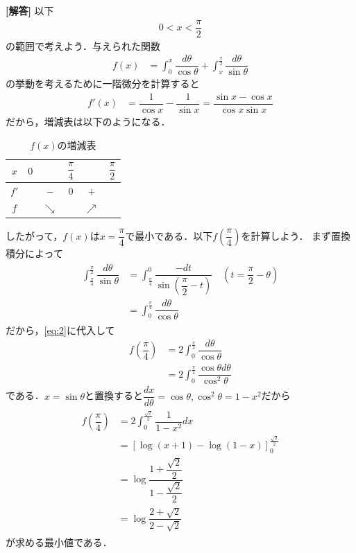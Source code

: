 \documentclass[../../main.tex]{subfiles}
\begin{document}
\begin{oframed}
  
\end{oframed}

{\bf [解答]}
以下
\begin{align}
  0<x<\dfrac{\pi}{2} \label{eq:1}
\end{align}
の範囲で考えよう．与えられた関数
\begin{align}
  f(x)&=\int_0^x\dfrac{d\theta}{\cos\theta}+\int_x^{\frac{\pi}{2}}\dfrac{d\theta}{\sin\theta} \label{eq:2}
\end{align}
の挙動を考えるために一階微分を計算すると
\begin{align}
  f'(x)&=\dfrac{1}{\cos x}-\dfrac{1}{\sin x}=\dfrac{\sin x-\cos x}{\cos x\sin x}
\end{align}
だから，増減表は以下のようになる．

\begin{table}[htb]
  \centering
  \caption{$f(x)$の増減表}
  \begin{tabular}{c|ccccc}
    $x$ & $0$ & & $\dfrac{\pi}{4}$ & & $\dfrac{\pi}{2}$ \\
    \hline
    $f'$ & & $-$ & $0$ & $+$ & \\
    \hline
    $f$ & & $\searrow$ & & $\nearrow$ &
  \end{tabular}
\end{table}
したがって，$f(x)$は$x=\dfrac{\pi}{4}$で最小である．以下$f\left(\dfrac{\pi}{4}\right)$を計算しよう．
まず置換積分によって
\begin{align}
  \begin{split}
    \int_{\frac{\pi}{4}}^{\frac{\pi}{2}}\dfrac{d\theta}{\sin\theta}
    &=\int_{\frac{\pi}{4}}^0\dfrac{-dt}{\sin\left(\dfrac{\pi}{2}-t\right)} \quad\left(t=\dfrac{\pi}{2}-\theta\right) \\
    &=\int_0^{\frac{\pi}{4}}\dfrac{d\theta}{\cos\theta}
  \end{split}
\end{align}
だから，\cref{eq:2}に代入して
\begin{align}
  f\left(\dfrac{\pi}{4}\right)
  &=2\int_0^{\frac{\pi}{4}}\dfrac{d\theta}{\cos\theta} \\
  &=2\int_0^{\frac{\pi}{4}}\dfrac{\cos\theta d\theta}{\cos^2\theta}
\end{align}
である．$x=\sin\theta$と置換すると$\dfrac{dx}{d\theta}=\cos\theta,\cos^2\theta=1-x^2$だから
\begin{align}
  \begin{split}
    f\left(\dfrac{\pi}{4}\right)
    &=2\int_0^{\frac{\sqrt{2}}{2}}\dfrac{1}{1-x^2}dx \\
    &=\left[\log(x+1)-\log(1-x)\right]_0^{\frac{\sqrt{2}}{2}} \\
    &=\log\dfrac{1+\dfrac{\sqrt{2}}{2}}{1-\dfrac{\sqrt{2}}{2}} \\
    &=\log\dfrac{2+\sqrt{2}}{2-\sqrt{2}}
  \end{split}
\end{align}
が求める最小値である．

\newpage
\end{document}
